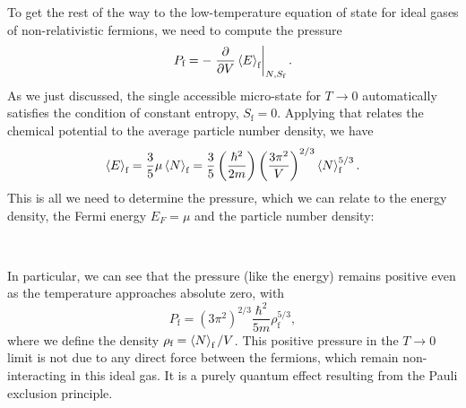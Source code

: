 To get the rest of the way to the low-temperature equation of state for ideal gases of non-relativistic fermions, we need to compute the pressure
\begin{equation*}
  P_{\text{f}} = -\left. \frac{\partial }{\partial V} \left\langle E \right\rangle_{\text{f}} \right|_{N, S_{\text{f}}}.
\end{equation*}
As we just discussed, the single accessible micro-state for $T \to 0$ automatically satisfies the condition of constant entropy, $S_{\text{f}} = 0$.
Applying  that relates the chemical potential to the average particle number density, we have
\begin{equation*}
  \left\langle E \right\rangle_{\text{f}} = \frac{3}{5} \mu \left\langle N \right\rangle_{\text{f}} = \frac{3}{5} \left(\frac{\hbar^2}{2m}\right) \left(\frac{3\pi^2}{V}\right)^{2 / 3} \left\langle N \right\rangle_{\text{f}}^{5 / 3}.
\end{equation*}
This is all we need to determine the pressure, which we can relate to the energy density, the Fermi energy $E_F = \mu$ and the particle number density:
\begin{mdframed}
  \ \\[85 pt]
\end{mdframed}
In particular, we can see that the pressure (like the energy) remains positive even as the temperature approaches absolute zero, with
\begin{equation}
  \label{eq:degen_pressure}
  P_{\text{f}} = \left(3\pi^2\right)^{2 / 3} \frac{\hbar^2}{5m} \rho_{\text{f}}^{5 / 3},
\end{equation}
where we define the density $\rho_{\text{f}} = \left\langle N \right\rangle_{\text{f}} / V$.
This positive pressure in the $T \to 0$ limit is not due to any direct force between the fermions, which remain non-interacting in this ideal gas.
It is a purely quantum effect resulting from the Pauli exclusion principle.

